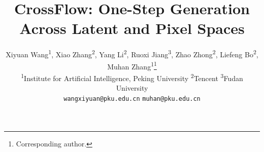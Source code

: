 \documentclass{article}
\title{CrossFlow: One-Step Generation Across Latent and Pixel Spaces}
\author{
Xiyuan Wang\textsuperscript{1},
Xiao Zhang\textsuperscript{2},
Yang Li\textsuperscript{2},
Ruoxi Jiang\textsuperscript{3},
Zhao Zhong\textsuperscript{2},
Liefeng Bo\textsuperscript{2},
Muhan Zhang\textsuperscript{1}\thanks{Corresponding author.}
\\
\textsuperscript{1}Institute for Artificial Intelligence, Peking University
\qquad
\textsuperscript{2}Tencent
\qquad
\textsuperscript{3}Fudan University
\\
\texttt{wangxiyuan@pku.edu.cn}
\qquad
\texttt{muhan@pku.edu.cn}
}
\begin{document}
\maketitle









\newpage
{
    \small
    
    
}
\appendix


\end{document}
